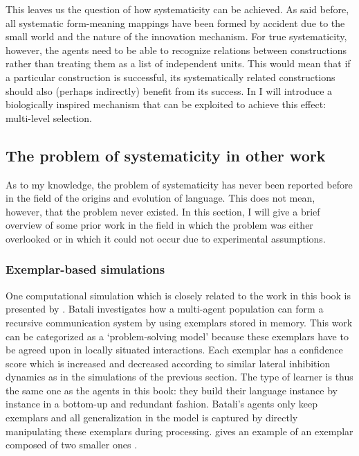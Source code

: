This leaves us the question of how systematicity can be achieved. As said before, all systematic form-meaning mappings have been formed by accident due to the small world and the nature of the innovation mechanism. For true systematicity, however, the agents need to be able to recognize relations between constructions rather than treating them as a list of independent units. This would mean that if a particular construction is successful, its systematically related constructions should also (perhaps indirectly) benefit from its success. In  I will introduce a biologically inspired mechanism that can be exploited to achieve this effect: multi-level selection.

\subsection{The problem of systematicity in other work}
\label{s:problem-systematicity}

As to my knowledge, the problem of systematicity has never been reported before in the field of the origins and evolution of language. This does not mean, however, that the problem never existed. In this section, I will give a brief overview of some prior work in the field in which the problem was either overlooked or in which it could not occur due to experimental assumptions.

\largerpage[-1]
\subsubsection{Exemplar-based simulations}
 One computational simulation which is closely related to the work in this book is presented by \citet{batali02negotiation}. Batali investigates how a multi-agent population can form a recursive communication system by using exemplars stored in memory. This work can be categorized as a `problem-solving model' because these exemplars have to be agreed upon in locally situated interactions. Each exemplar has a confidence score which is increased and decreased according to similar lateral inhibition dynamics as in the simulations of the previous section. The type of learner is thus the same one as the agents in this book: they build their language instance by instance in a bottom-up and redundant fashion. Batali's agents only keep exemplars and all generalization in the model is captured by directly manipulating these exemplars during processing.  gives an example of an exemplar composed of two smaller ones \citep[exemplar 5.1.2.a]{batali02negotiation}.

